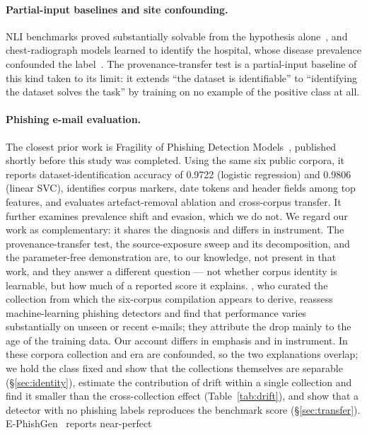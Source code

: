 \documentclass[twoside,11pt]{article}
\begin{document}
\paragraph{Partial-input baselines and site confounding.}
NLI benchmarks proved substantially solvable from the hypothesis
alone~\citep{gururangan2018,poliak2018}, and chest-radiograph models learned to
identify the hospital, whose disease prevalence confounded the
label~\citep{zech2018}. The provenance-transfer test is a partial-input
baseline of this kind taken to its limit: it extends ``the dataset is
identifiable'' to ``identifying the dataset solves the task'' by training on
no example of the positive class at all.

\paragraph{Phishing e-mail evaluation.}
The closest prior work is Fragility of Phishing Detection
Models~\citep{fragility2026}, published shortly before this study was completed.
Using the same six public corpora, it reports dataset-identification accuracy
of 0.9722 (logistic regression) and 0.9806 (linear SVC), identifies corpus
markers, date tokens and header fields among top features, and evaluates
artefact-removal ablation and cross-corpus transfer. It further examines
prevalence shift and evasion, which we do not. We regard our work as
complementary: it shares the diagnosis and differs in instrument. The
provenance-transfer test, the source-exposure sweep and its decomposition, and
the parameter-free demonstration are, to our knowledge, not present in that
work, and they answer a different question --- not whether
corpus identity is learnable, but how much of a reported score it explains.
\citet{champa2025illusion}, who curated the collection from
which the six-corpus compilation appears to derive, reassess machine-learning
phishing detectors and find that performance varies substantially on unseen
or recent e-mails; they attribute the drop mainly to the age of the training
data. Our account differs in emphasis and in instrument. In these corpora
collection and era are confounded, so the two explanations overlap; we hold
the class fixed and show that the collections themselves are separable
(\S\ref{sec:identity}), estimate the contribution of drift within a single
collection and find it smaller than the cross-collection effect
(Table~\ref{tab:drift}), and show that a detector with no phishing labels
reproduces the benchmark score (\S\ref{sec:transfer}).
E-PhishGen~\citep{pajola2025ephishgen} reports near-perfect
\end{document}
